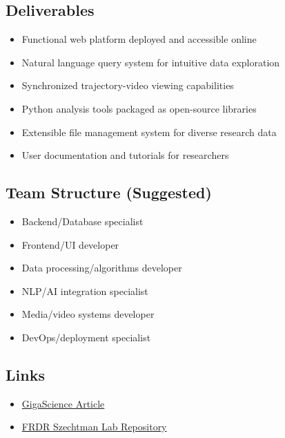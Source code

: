 \documentclass[12pt]{article}
\begin{document}
\subsection*{Deliverables}
\begin{itemize}
    \item Functional web platform deployed and accessible online
    \item Natural language query system for intuitive data exploration
    \item Synchronized trajectory-video viewing capabilities
    \item Python analysis tools packaged as open-source libraries
    \item Extensible file management system for diverse research data
    \item User documentation and tutorials for researchers
\end{itemize}

\subsection*{Team Structure (Suggested)}
\begin{itemize}
    \item Backend/Database specialist
    \item Frontend/UI developer
    \item Data processing/algorithms developer
    \item NLP/AI integration specialist
    \item Media/video systems developer
    \item DevOps/deployment specialist
\end{itemize}

\subsection*{Links}
\begin{itemize}
    \item \href{https://academic.oup.com/gigascience/article/doi/10.1093/gigascience/giac092/6756450}{GigaScience Article}
    \item \href{https://www.frdr-dfdr.ca/repo/collection/szechtmanlab}{FRDR Szechtman Lab Repository}
\end{itemize}
\end{document}
